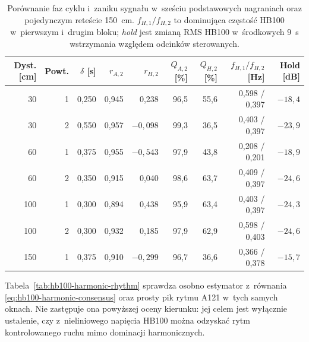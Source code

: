 \documentclass[12pt,a4paper,oneside]{report}
\begin{document}
\begin{table}[H]
\centering
\caption{Porównanie faz cyklu i~zaniku sygnału w~sześciu podstawowych
nagraniach oraz pojedynczym reteście \SI{150}{cm}. $f_{H,1}/f_{H,2}$ to dominująca częstość HB100 w~pierwszym
i~drugim bloku; \emph{hold} jest zmianą RMS HB100 w~środkowych \SI{9}{s}
wstrzymania względem odcinków sterowanych.}
\label{tab:hb100-a121-wyniki}
\footnotesize
\setlength{\tabcolsep}{3.5pt}
\begin{tabular}{@{}rrrrrrrrr@{}}
\toprule
Dyst. [cm] & Powt. & $\delta$ [s] & $r_{A,2}$ & $r_{H,2}$ & $Q_{A,2}$ [\%] & $Q_{H,2}$ [\%] & $f_{H,1}/f_{H,2}$ [Hz] & Hold [dB] \\
\midrule
 30 & 1 & 0,250 & 0,945 &  0,238 & 96,5 & 55,6 & 0,598 / 0,397 & $-18{,}4$ \\
 30 & 2 & 0,550 & 0,957 & $-0{,}098$ & 99,3 & 36,5 & 0,403 / 0,397 & $-23{,}9$ \\
 60 & 1 & 0,375 & 0,955 & $-0{,}543$ & 97,9 & 43,8 & 0,208 / 0,201 & $-18{,}9$ \\
 60 & 2 & 0,350 & 0,915 &  0,040 & 98,6 & 63,7 & 0,409 / 0,397 & $-24{,}6$ \\
100 & 1 & 0,300 & 0,894 &  0,438 & 95,9 & 63,4 & 0,403 / 0,397 & $-24{,}3$ \\
100 & 2 & 0,300 & 0,932 &  0,185 & 97,9 & 62,9 & 0,598 / 0,403 & $-24{,}6$ \\
150 & 1 & 0,375 & 0,910 & $-0{,}299$ & 96,7 & 36,6 & 0,366 / 0,378 & $-15{,}7$ \\
\bottomrule
\end{tabular}
\end{table}

Tabela~\ref{tab:hb100-harmonic-rhythm} sprawdza osobno estymator z~równania
\eqref{eq:hb100-harmonic-consensus} oraz prosty pik rytmu A121 w~tych samych
oknach. Nie zastępuje ona powyższej oceny kierunku: jej celem jest wyłącznie
ustalenie, czy z~nieliniowego napięcia HB100 można odzyskać rytm
kontrolowanego ruchu mimo dominacji harmonicznych.
\end{document}
